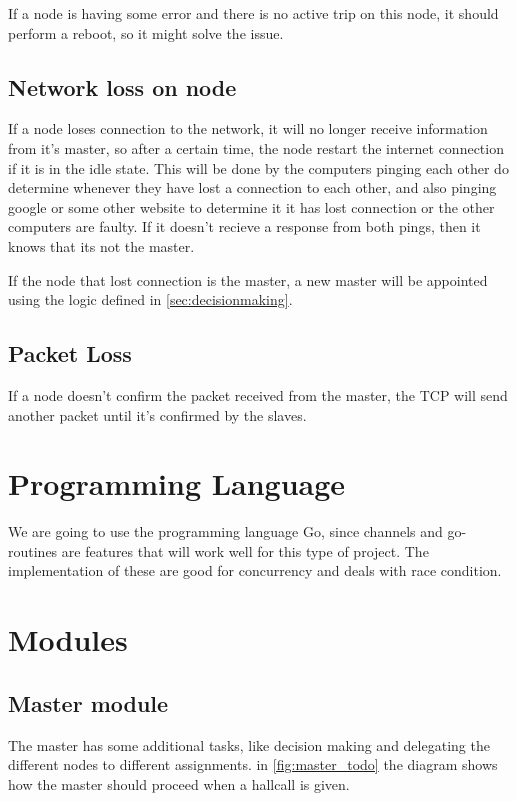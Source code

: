 If a node is having some error and there is no active trip on this node, it should perform a reboot, so it might solve the issue.

\subsection{Network loss on node}
If a node loses connection to the network, it will no longer receive information from it's master, so after a certain time, the node restart the internet connection if it is in the idle state. This will be done by the computers pinging each other do determine whenever they have lost a connection to each other, and also pinging google or some other website to determine it it has lost connection or the other computers are faulty. If it doesn't recieve a response from both pings, then it knows that its not the master.

If the node that lost connection is the master, a new master will be appointed using the logic defined in \autoref{sec:decisionmaking}. 

\subsection{Packet Loss}
If a node doesn't confirm the packet received from the master, the TCP will send another packet until it's confirmed by the slaves. 

\subsection{}


\section{Programming Language}
We are going to use the programming language Go, since channels and go-routines are features that will work well for this type of project. The implementation of these are good for concurrency and deals with race condition. 


\section{Modules}

\subsection{Master module}
The master has some additional tasks, like decision making and delegating the different nodes to different assignments. in \autoref{fig:master_todo} the diagram shows how the master should proceed when a hallcall is given. 

